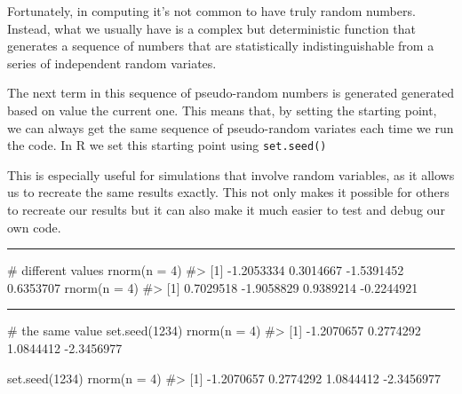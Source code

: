 \documentclass[
  letterpaper,
  DIV=11,
  numbers=noendperiod]{scrreprt}
\newenvironment{Shaded}{\begin{snugshade}}{\end{snugshade}}
\newcommand{\AttributeTok}[1]{\textcolor[rgb]{0.40,0.45,0.13}{#1}}
\newcommand{\CommentTok}[1]{\textcolor[rgb]{0.37,0.37,0.37}{#1}}
\newcommand{\DecValTok}[1]{\textcolor[rgb]{0.68,0.00,0.00}{#1}}
\newcommand{\FunctionTok}[1]{\textcolor[rgb]{0.28,0.35,0.67}{#1}}
\newcommand{\NormalTok}[1]{\textcolor[rgb]{0.00,0.23,0.31}{#1}}
\begin{document}
Fortunately, in computing it's not common to have truly random numbers.
Instead, what we usually have is a complex but deterministic function
that generates a sequence of numbers that are statistically
indistinguishable from a series of independent random variates.

The next term in this sequence of pseudo-random numbers is generated
generated based on value the current one. This means that, by setting
the starting point, we can always get the same sequence of pseudo-random
variates each time we run the code. In R we set this starting point
using \texttt{set.seed()}

This is especially useful for simulations that involve random variables,
as it allows us to recreate the same results exactly. This not only
makes it possible for others to recreate our results but it can also
make it much easier to test and debug our own code.

\begin{center}\rule{0.5\linewidth}{0.5pt}\end{center}

\begin{Shaded}
\begin{Highlighting}[]
\CommentTok{\# different values}
\FunctionTok{rnorm}\NormalTok{(}\AttributeTok{n =} \DecValTok{4}\NormalTok{)}
\CommentTok{\#\textgreater{} [1] {-}1.2053334  0.3014667 {-}1.5391452  0.6353707}
\FunctionTok{rnorm}\NormalTok{(}\AttributeTok{n =} \DecValTok{4}\NormalTok{)}
\CommentTok{\#\textgreater{} [1]  0.7029518 {-}1.9058829  0.9389214 {-}0.2244921}
\end{Highlighting}
\end{Shaded}

\begin{center}\rule{0.5\linewidth}{0.5pt}\end{center}

\begin{Shaded}
\begin{Highlighting}[]
\CommentTok{\# the same value}
\FunctionTok{set.seed}\NormalTok{(}\DecValTok{1234}\NormalTok{)}
\FunctionTok{rnorm}\NormalTok{(}\AttributeTok{n =} \DecValTok{4}\NormalTok{)}
\CommentTok{\#\textgreater{} [1] {-}1.2070657  0.2774292  1.0844412 {-}2.3456977}

\FunctionTok{set.seed}\NormalTok{(}\DecValTok{1234}\NormalTok{)}
\FunctionTok{rnorm}\NormalTok{(}\AttributeTok{n =} \DecValTok{4}\NormalTok{)}
\CommentTok{\#\textgreater{} [1] {-}1.2070657  0.2774292  1.0844412 {-}2.3456977}
\end{Highlighting}
\end{Shaded}
\end{document}
